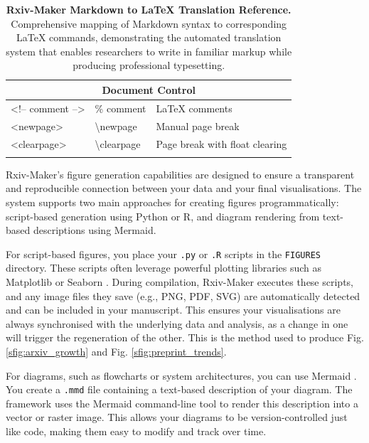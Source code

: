 \begin{longtable}{|p{}|p{}|p{}|}
\multicolumn{3}{|c|}{\textbf{Document Control}} \\
\hline
\textless !-- comment --\textgreater & \% comment & LaTeX comments \\
<newpage> & \textbackslash newpage & Manual page break \\
<clearpage> & \textbackslash clearpage & Page break with float clearing \\
\hline
\caption{\textbf{Rxiv-Maker Markdown to LaTeX Translation Reference.} Comprehensive mapping of Markdown syntax to corresponding LaTeX commands, demonstrating the automated translation system that enables researchers to write in familiar markup while producing professional typesetting.}
\end{longtable}

\label{snote:programmatic_figures}

Rxiv-Maker's figure generation capabilities are designed to ensure a transparent and reproducible connection between your data and your final visualisations. The system supports two main approaches for creating figures programmatically: script-based generation using Python or R, and diagram rendering from text-based descriptions using Mermaid.

For script-based figures, you place your \texttt{.py} or \texttt{.R} scripts in the \texttt{FIGURES} directory. These scripts often leverage powerful plotting libraries such as Matplotlib \cite{Hunter2007_matplotlib} or Seaborn \cite{Waskom2021_seaborn}. During compilation, Rxiv-Maker executes these scripts, and any image files they save (e.g., PNG, PDF, SVG) are automatically detected and can be included in your manuscript. This ensures your visualisations are always synchronised with the underlying data and analysis, as a change in one will trigger the regeneration of the other. This is the method used to produce Fig. \ref{sfig:arxiv_growth} and Fig. \ref{sfig:preprint_trends}.

For diagrams, such as flowcharts or system architectures, you can use Mermaid \cite{Mermaid2023_documentation}. You create a \texttt{.mmd} file containing a text-based description of your diagram. The framework uses the Mermaid command-line tool to render this description into a vector or raster image. This allows your diagrams to be version-controlled just like code, making them easy to modify and track over time.

\label{snote:mathematical_formulas}

